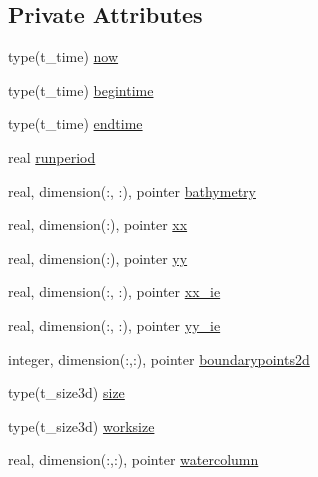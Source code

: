\subsection*{Private Attributes}
\begin{DoxyCompactItemize}
\item 
type(t\+\_\+time) \mbox{\hyperlink{structmodulelagrangian_1_1t__externalvar_a82cd31b3ecf6cb74dc94639ea83d74aa}{now}}
\item 
type(t\+\_\+time) \mbox{\hyperlink{structmodulelagrangian_1_1t__externalvar_a03f2d63e8d78696a3c25947a0ebd1d07}{begintime}}
\item 
type(t\+\_\+time) \mbox{\hyperlink{structmodulelagrangian_1_1t__externalvar_a426bbfa94e804810311af59fe2cb4bbd}{endtime}}
\item 
real \mbox{\hyperlink{structmodulelagrangian_1_1t__externalvar_a2f64c81923bea0daa777146749dcd390}{runperiod}}
\item 
real, dimension(\+:, \+:), pointer \mbox{\hyperlink{structmodulelagrangian_1_1t__externalvar_ae25fb305bd0b72a88c7f2eb7172dfbcf}{bathymetry}}
\item 
real, dimension(\+:), pointer \mbox{\hyperlink{structmodulelagrangian_1_1t__externalvar_a94611d66eb73038a118a47f31bb839ca}{xx}}
\item 
real, dimension(\+:), pointer \mbox{\hyperlink{structmodulelagrangian_1_1t__externalvar_aca219bc9638788cf24c31b4b4e7baf8d}{yy}}
\item 
real, dimension(\+:, \+:), pointer \mbox{\hyperlink{structmodulelagrangian_1_1t__externalvar_ac8f1c532dde2c1f6d577184aee016e59}{xx\+\_\+ie}}
\item 
real, dimension(\+:, \+:), pointer \mbox{\hyperlink{structmodulelagrangian_1_1t__externalvar_ab34e2ffd6027a7f9b563a8f492ca46ab}{yy\+\_\+ie}}
\item 
integer, dimension(\+:,\+:), pointer \mbox{\hyperlink{structmodulelagrangian_1_1t__externalvar_a605247dabe3a7a6a6223bc3a37b17116}{boundarypoints2d}}
\item 
type(t\+\_\+size3d) \mbox{\hyperlink{structmodulelagrangian_1_1t__externalvar_a1ecf9113cdcb6a37619f2b7ec2479533}{size}}
\item 
type(t\+\_\+size3d) \mbox{\hyperlink{structmodulelagrangian_1_1t__externalvar_a90096db39e6fc885571a18e87804c38e}{worksize}}
\item 
real, dimension(\+:,\+:), pointer \mbox{\hyperlink{structmodulelagrangian_1_1t__externalvar_a93a9c4a899f6346be30866044e488dca}{watercolumn}}
\item 

\end{DoxyCompactItemize}
